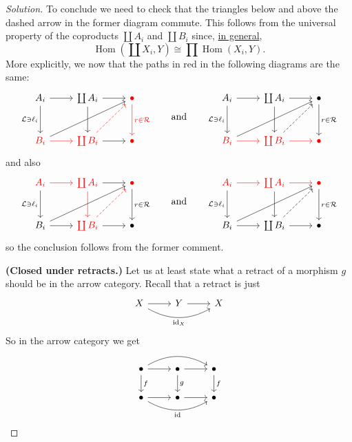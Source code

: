 \documentclass{article}
\numberwithin{equation}{section}
\newcommand{\Lc}{\mathcal{L}}
\newcommand{\Rc}{\mathcal{R}}
\DeclareMathOperator{\id}{id}
\DeclareMathOperator{\Hom}{Hom}
\begin{document}
\begin{proof}[Solution]
	To conclude we need to check that the triangles below and above the dashed arrow in the former diagram commute. This follows from the universal property of the coproducts $\coprod A_i$ and $\coprod B_i$ since, \href{https://en.wikipedia.org/wiki/Coproduct#Discussion}{in general},
	\[\Hom\left(\coprod X_i,Y\right)\cong\prod\Hom(X_i,Y).\]
	More explicitly, we now that the paths in red in the following diagrams are the same:
	\[\begin{tikzcd}[row sep=large]
		A_i\arrow[r]\arrow[d,"\Lc\ni\ell_i",swap]&\coprod A_i\arrow[d]\arrow[r]&{\color{red}\bullet}\arrow[d,"r\in\Rc",red]\\
		{\color{red}B_i}\arrow[r,red]\arrow[rru]&{\color{red}\coprod B_i}\arrow[r]\arrow[ur,dashed,red]&{\color{red}\bullet}
	\end{tikzcd}\qquad
		\text{and}\qquad
	\begin{tikzcd}[row sep=large]
		A_i\arrow[r]\arrow[d,"\Lc\ni\ell_i",swap]&\coprod A_i\arrow[d]\arrow[r]&\bullet\arrow[d,"r\in\Rc"]\\
		{\color{red}B_i}\arrow[r,red]\arrow[rru]&{\color{red}\coprod B_i}\arrow[r,red]\arrow[ur,dashed]&{\color{red}\bullet}
	\end{tikzcd}\]
	and also
	\[\begin{tikzcd}[row sep=large]
		{\color{red}A_i}\arrow[r,red]\arrow[d,"\Lc\ni\ell_i",swap]&{\color{red}\coprod A_i}\arrow[d,red]\arrow[r]&{\color{red}\bullet}\arrow[d,"r\in\Rc"]\\
		B_i\arrow[r]\arrow[rru]&{\color{red}\coprod B_i}\arrow[r]\arrow[ur,dashed,red]&\bullet
	\end{tikzcd}\qquad
	\text{and}\qquad
	\begin{tikzcd}[row sep=large]
		{\color{red}A_i}\arrow[r,red]\arrow[d,"\Lc\ni\ell_i",swap]&{\color{red}\coprod A_i}\arrow[d]\arrow[r,red]&{\color{red}\bullet}\arrow[d,"r\in\Rc"]\\
		B_i\arrow[r]\arrow[rru]&\coprod B_i\arrow[r]\arrow[ur,dashed]&\bullet
	\end{tikzcd}\]
	so the conclusion follows from the former comment.
	
	\textbf{(Closed under retracts.)} Let us at least state what a retract of a morphism $g$ should be in the arrow category. Recall that a retract is just
	\[\begin{tikzcd}
		X\arrow[r]\arrow[rr,bend right,"\id_X",swap]&Y\arrow[r]&X
	\end{tikzcd}\]
	So in the arrow category we get
	\[\begin{tikzcd}
		\bullet\arrow[r]\arrow[rr,bend left]\arrow[d,"f"]&\bullet\arrow[d,"g"]\arrow[r]&\bullet\arrow[d,"f"]\\
		\bullet\arrow[r]\arrow[rr,bend right,swap,"\id"]&\bullet\arrow[r]&\bullet
	\end{tikzcd}\]
\end{proof}
\end{document}
